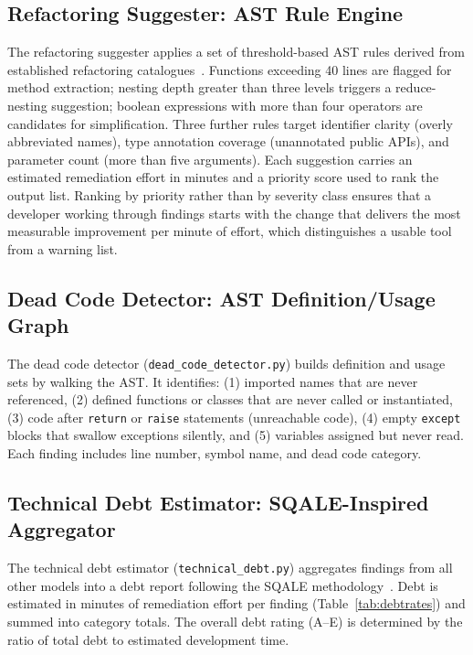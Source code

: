 \documentclass[12pt, oneside]{report}
\begin{document}
\subsection{Refactoring Suggester: AST Rule Engine}
\label{ssec:refactoring}

The refactoring suggester applies a set of threshold-based AST rules derived from
established refactoring catalogues~\cite{fowler1999}. Functions exceeding 40 lines
are flagged for method extraction; nesting depth greater than three levels triggers
a reduce-nesting suggestion; boolean expressions with more than four operators are
candidates for simplification. Three further rules target identifier clarity (overly
abbreviated names), type annotation coverage (unannotated public APIs), and
parameter count (more than five arguments). Each suggestion carries an estimated
remediation effort in minutes and a priority score used to rank the output list. Ranking
by priority rather than by severity class ensures that a developer working through
findings starts with the change that delivers the most measurable improvement per minute
of effort, which distinguishes a usable tool from a warning list.

\subsection{Dead Code Detector: AST Definition/Usage Graph}
\label{ssec:deadcode}

The dead code detector (\texttt{dead\_code\_detector.py}) builds definition and usage
sets by walking the AST. It identifies: (1) imported names that are never referenced,
(2) defined functions or classes that are never called or instantiated, (3) code after
\texttt{return} or \texttt{raise} statements (unreachable code), (4) empty \texttt{except}
blocks that swallow exceptions silently, and (5) variables assigned but never read.
Each finding includes line number, symbol name, and dead code category.

\subsection{Technical Debt Estimator: SQALE-Inspired Aggregator}
\label{ssec:debt}

The technical debt estimator (\texttt{technical\_debt.py}) aggregates findings from all
other models into a debt report following the SQALE methodology~\cite{letouzey2012}.
Debt is estimated in minutes of remediation effort per finding (Table~\ref{tab:debtrates})
and summed into category totals. The overall debt rating (A--E) is determined by the
ratio of total debt to estimated development time.
\end{document}
